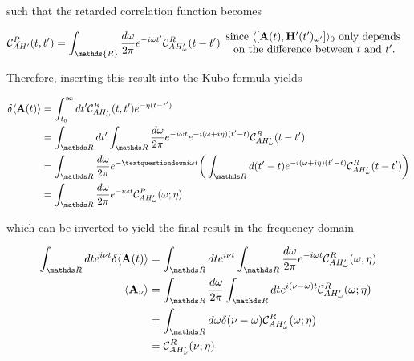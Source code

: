 \documentclass{homework}
\begin{document}
such that the retarded correlation function becomes 

\begin{equation}
    \mathcal{C}_{AH'}^{R}(t,t') = \int_{\mathds{R}} \frac{d\omega}{2\pi} e^{-i\omega t'} \mathcal{C}_{AH'_\omega}^{R}(t-t') \begin{array}{c}
         \textnormal{since $\langle[{{\bf A}}(t), \Hamiltonian'(t')_{\omega'}]\rangle_{0}$ only depends } \\
         \textnormal{ on the difference between $t$ and $t'$. }
    \end{array}
\end{equation}

Therefore, inserting this result into the Kubo formula yields

\begin{equation}
    \begin{split}
        \delta \langle {{\bf A}}(t) \rangle
        &= \int_{t_0}^{\infty} dt' \mathcal{C}_{AH'_\omega}^{R}(t,t') e^{-\eta(t-t')} \\
        &= \int_{\R} dt' \int_{\R} \frac{d\omega}{2\pi} e^{-i\omega t} e^{-i(\omega + i\eta) (t'-t)} \mathcal{C}_{AH'_\omega}^{R}(t-t') \\
        &= \int_{\R} \frac{d\omega}{2\pi} e^{-¿i\omega t} \bigg(\int_{\R} d(t'-t) e^{-i(\omega + i\eta)(t'-t)} \mathcal{C}_{AH'_\omega}^{R}(t-t')\bigg) \\
        &= \int_{\R} \frac{d\omega}{2\pi} e^{-i\omega t} \mathcal{C}_{AH'_\omega}^{R}(\omega; \eta) 
    \end{split}
\end{equation}

which can be inverted to yield the final result in the frequency domain

\begin{equation}
    \begin{split}
        \int_{\R} {dt} e^{i\nu t}
        \delta \langle {{\bf A}}(t) \rangle &= \int_{\R} {dt} e^{i\nu t} \int_{\R} \frac{d\omega}{2\pi} e^{-i\omega t} \mathcal{C}_{AH'_\omega}^{R}(\omega; \eta) \\
        \langle {{\bf A}}_\nu \rangle &= \int_{\R} \frac{d\omega}{2\pi} \int_{\R} dt e^{i(\nu - \omega)t} \mathcal{C}_{AH'_\omega}^{R}(\omega; \eta) \\
        &= \int_{\R} {d\omega} \delta(\nu - \omega) \mathcal{C}_{AH'_\omega}^{R}(\omega; \eta) \\
        &= \mathcal{C}_{AH'_\nu}^{R}(\nu; \eta) 
    \end{split}
\end{equation}
\end{document}
